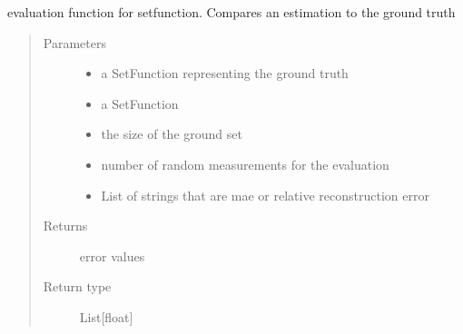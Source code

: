 \documentclass[letterpaper,10pt,english]{sphinxmanual}
\begin{document}
\begin{fulllineitems}
\label{\detokenize{setFTs:setFTs.setfunctions.eval_sf}}
\sphinxAtStartPar
evaluation function for setfunction. Compares an estimation to the ground truth
\begin{quote}\begin{description}
\item[{Parameters}] \leavevmode\begin{itemize}
\item {} 
\sphinxAtStartPar
{} \textendash{} a SetFunction representing the ground truth

\item {} 
\sphinxAtStartPar
{} \textendash{} a SetFunction

\item {} 
\sphinxAtStartPar
{} \textendash{} the size of the ground set

\item {} 
\sphinxAtStartPar
{} \textendash{} number of random measurements for the evaluation

\item {} 
\sphinxAtStartPar
{} \textendash{} List of strings that are mae or relative reconstruction error

\end{itemize}

\item[{Returns}] \leavevmode
\sphinxAtStartPar
error values

\item[{Return type}] \leavevmode
\sphinxAtStartPar
List{[}float{]}

\end{description}\end{quote}

\end{fulllineitems}
\end{document}
